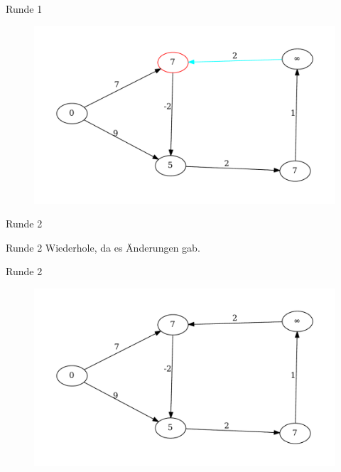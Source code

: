 \begin{frame}{Runde 1}
\begin{figure}[htbp]
\centering
\includegraphics[width=\linewidth]{bellman_ford_graphs/graph_06.pdf}
\end{figure}
\end{frame}

\begin{frame}{Runde 2}
	\begin{block}{Runde 2}
	Wiederhole, da es Änderungen gab.
	\end{block}
\end{frame}

\begin{frame}{Runde 2}
\begin{figure}[htbp]
\centering
\includegraphics[width=\linewidth]{bellman_ford_graphs/graph_07.pdf}
\end{figure}
\end{frame}

